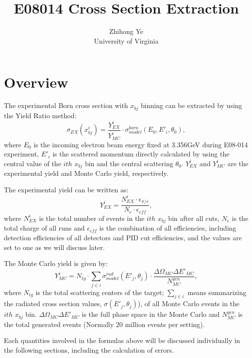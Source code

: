 \documentclass[a4paper,12.pt]{article}
\title{E08014 Cross Section Extraction}
\author{Zhihong Ye\\ University of Virginia}
\begin{document}
\section{Overview}

The experimental Born cross section with $x_{bj}$ binning can be extracted by using the Yield Ratio method:
\begin{equation}
   \sigma_{EX}(x_{bj}^{i}) = \frac{ Y^{i}_{EX}}{Y^{i}_{MC}} \cdot \sigma^{born}_{model}(E_{0},E'_{i}, \theta_{0}),
   \label{eqxs}
\end{equation}
where $E_{0}$ is the incoming electron beam energy fixed at 3.356GeV during E08-014 experiment, $E'_{i}$ is the scattered momentum directly calculated by using the central value of the $ith$ $x_{bj}$ bin and the central scattering $\theta_{0}$. $Y^{i}_{EX}$ and $Y^{i}_{MC}$ are the experimental yield and Monte Carlo yield, respectively.

The experimental yield can be written as:
\begin{equation}
   Y^{i}_{EX} = \frac{N^{i}_{EX}\cdot \epsilon_{\pi/e}}{N_{e} \cdot \epsilon_{eff}},
 \label{eqyex}
\end{equation}
where $N^{i}_{EX}$ is the total number of events in the $ith$ $x_{bj}$ bin after all cuts, $N_{e}$ is the total charge of all runs and $\epsilon_{eff}$ is the combination of all efficiencies, including detection efficiencies of all detectors and PID cut efficiencies, and the values are set to one as we will discuss later.

The Monte Carlo yield is given by:
\begin{equation}
   Y^{i}_{MC} = N_{tg}\cdot \sum_{j\in i}\sigma^{rad}_{model}(E'_{j},\theta_{j}) \cdot \frac{\Delta\Omega_{MC} \Delta E'_{MC}}{N_{MC}^{gen}} ,
   \label{eqymc}
\end{equation}
where $N_{tg}$ is the total scattering centers of the target; $\sum_{j\in i}$ means summarizing the radiated cross section values, $\sigma(E'_{j},\theta_{j})$), of all Monte Carlo events in the $ith$ $x_{bj}$ bin. $\Delta\Omega_{MC} \Delta E'_{MC}$ is the full phase space in the Monte Carlo and $N_{MC}^{gen}$ is the total generated events (Normally 20 million events per setting).

Each quantities involved in the formulas above will be discussed individually in the following sections, including the calculation of errors. 
\end{document}
